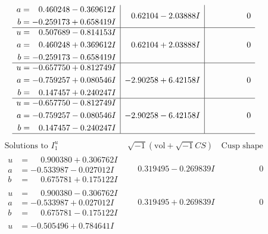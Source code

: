 \documentclass[1p]{elsarticle_modified}
\theoremstyle{definition}
\newcommand{\I}{\sqrt{-1}}
\begin{document}
$$\begin{array}{c|c|c}
\begin{aligned}
a &= \phantom{-}0.460248 - 0.369612 I \\
b &= -0.259173 + 0.658419 I\end{aligned}
 & \phantom{-}0.62104 - 2.03888 I & \phantom{-0.000000 } 0 \\ \hline\begin{aligned}
u &= \phantom{-}0.507689 - 0.814153 I \\
a &= \phantom{-}0.460248 + 0.369612 I \\
b &= -0.259173 - 0.658419 I\end{aligned}
 & \phantom{-}0.62104 + 2.03888 I & \phantom{-0.000000 } 0 \\ \hline\begin{aligned}
u &= -0.657750 + 0.812749 I \\
a &= -0.759257 + 0.080546 I \\
b &= \phantom{-}0.147457 + 0.240247 I\end{aligned}
 & -2.90258 + 6.42158 I & \phantom{-0.000000 } 0 \\ \hline\begin{aligned}
u &= -0.657750 - 0.812749 I \\
a &= -0.759257 - 0.080546 I \\
b &= \phantom{-}0.147457 - 0.240247 I\end{aligned}
 & -2.90258 - 6.42158 I & \phantom{-0.000000 } 0\\
 \hline 
 \end{array}$$\newpage$$\begin{array}{c|c|c}  
\text{Solutions to }I^u_{1}& \I (\text{vol} + \sqrt{-1}CS) & \text{Cusp shape}\\
 \hline 
\begin{aligned}
u &= \phantom{-}0.900380 + 0.306762 I \\
a &= -0.533987 - 0.027012 I \\
b &= \phantom{-}0.675781 + 0.175122 I\end{aligned}
 & \phantom{-}0.319495 - 0.269839 I & \phantom{-0.000000 } 0 \\ \hline\begin{aligned}
u &= \phantom{-}0.900380 - 0.306762 I \\
a &= -0.533987 + 0.027012 I \\
b &= \phantom{-}0.675781 - 0.175122 I\end{aligned}
 & \phantom{-}0.319495 + 0.269839 I & \phantom{-0.000000 } 0 \\ \hline\begin{aligned}
u &= -0.505496 + 0.784641 I \\

\end{aligned}
\end{array}$$
\end{document}

